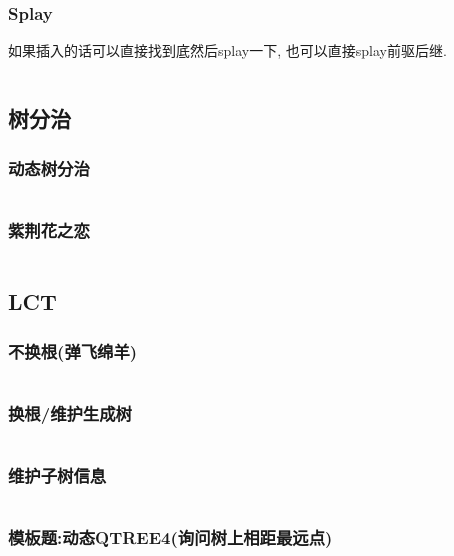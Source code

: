 \documentclass[a4paper]{article}
\begin{document}
\begin{multicols}{2}
		
				\subsubsection{Splay}
					如果插入的话可以直接找到底然后splay一下, 也可以直接splay前驱后继.
					\inputminted[]{cpp}{../src/datastructure/文艺平衡树.cpp}
				
				
			\subsection{树分治}

				
				\subsubsection{动态树分治}
					\inputminted{cpp}{../src/datastructure/动态树分治.cpp}

				\subsubsection{紫荆花之恋}
					\inputminted{cpp}{../src/datastructure/紫荆花之恋.cpp}
	
			\subsection{LCT}
				\subsubsection{不换根(弹飞绵羊)}
					\inputminted{cpp}{../src/datastructure/LCT(不换根).cpp}
			
				\subsubsection{换根/维护生成树}
					\inputminted{cpp}{../src/datastructure/LCT(换根).cpp}

				\subsubsection{维护子树信息}
					\inputminted{cpp}{../src/datastructure/LCT维护子树信息.cpp}
					
				\subsubsection{模板题:动态QTREE4(询问树上相距最远点)}
						\inputminted{cpp}{../src/datastructure/动态QTREE4.cpp}
	

\end{multicols}
\end{document}
